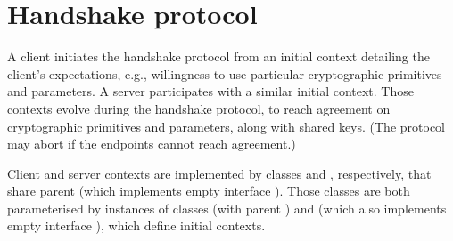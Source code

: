 \section{Handshake protocol}\label{sec:handshake}

A client initiates the handshake protocol from an initial context detailing the client's 
expectations, e.g., willingness to use particular cryptographic primitives and parameters.
A server participates with a similar initial context.
Those contexts evolve during the handshake protocol, to reach agreement on cryptographic
primitives and parameters, along with shared keys.
(The protocol may abort if the endpoints cannot reach agreement.)

\begin{tcolorbox}
Client and server contexts are implemented by classes  and
, respectively, that share parent
 (which implements empty interface ).
Those classes are both parameterised by instances of classes  (with parent
) and  (which also implements empty 
interface ), which define initial contexts.
\end{tcolorbox}
